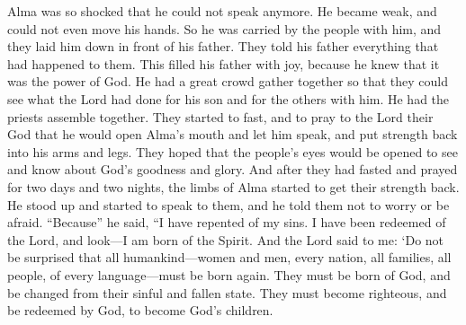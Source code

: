 Alma was so shocked that he could not speak anymore. He became weak, and could not even move his hands. So he was carried by the people with him, and they laid him down in front of his father.
\bverse \iffalse And they rehearsed unto his father all that had happened unto them; and his father rejoiced, for he knew that it was the power of God. \fi
They told his father everything that had happened to them. This filled his father with joy, because he knew that it was the power of God.
\bverse \iffalse And he caused that a multitude should be gathered together that they might witness what the Lord had done for his son, and also for those that were with him. \fi
He had a great crowd gather together so that they could see what the Lord had done for his son and for the others with him.
\bverse \iffalse And he caused that the priests should assemble themselves together; and they began to fast, and to pray to the Lord their God that he would open the mouth of Alma, that he might speak, and also that his limbs might receive their strength--that the eyes of the people might be opened to see and know of the goodness and glory of God. \fi
He had the priests assemble together. They started to fast, and to pray to the Lord their God that he would open Alma's mouth and let him speak, and put strength back into his arms and legs. They hoped that the people's eyes would be opened to see and know about God's goodness and glory.
\bverse \iffalse And it came to pass after they had fasted and prayed for the space of two days and two nights, the limbs of Alma received their strength, and he stood up and began to speak unto them, bidding them to be of good comfort: \fi
And after they had fasted and prayed for two days and two nights, the limbs of Alma started to get their strength back. He stood up and started to speak to them, and he told them not to worry or be afraid.
\bverse \iffalse For, said he, I have repented of my sins, and have been redeemed of the Lord; behold I am born of the Spirit. \fi
``Because'' he said, ``I have repented of my sins. I have been redeemed of the Lord, and look---I am born of the Spirit.
\bverse \iffalse And the Lord said unto me: Marvel not that all mankind, yea, men and women, all nations, kindreds, tongues and people, must be born again; yea, born of God, changed from their carnal and fallen state, to a state of righteousness, being redeemed of God, becoming his sons and daughters; \fi
And the Lord said to me: \lq Do not be surprised that all humankind---women and men, every nation, all families, all people, of every language---must be born again. They must be born of God, and be changed from their sinful and fallen state. They must become righteous, and be redeemed by God, to become God's children.
